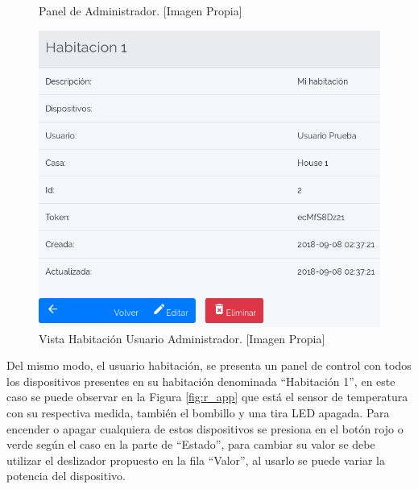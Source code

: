 \begin{figure}[!t]
	\centering
	\caption[Panel de Administrador.]{Panel de Administrador. [Imagen Propia]}
	\label{fig:r-adm}
\end{figure}

\begin{figure}[!t]
	\centering
	\caption[Vista Habitación Usuario Administrador.]{Vista Habitación Usuario Administrador. [Imagen Propia]}
	\label{fig:r-room}
	\includegraphics[width=0.45\linewidth]{Imagenes/R_room}
\end{figure}

Del mismo modo, el usuario habitación, se presenta un panel de control con todos los dispositivos presentes en su habitación denominada ``Habitación 1'', en este caso se puede observar en la Figura \ref{fig:r_app} que está el sensor de temperatura con su respectiva medida, también el bombillo y una tira LED apagada. Para encender o apagar cualquiera de estos dispositivos se presiona en el botón rojo o verde según el caso en la parte de ``Estado'', para cambiar su valor se debe utilizar el deslizador propuesto en la fila ``Valor'', al usarlo se puede variar la potencia del dispositivo.\\

